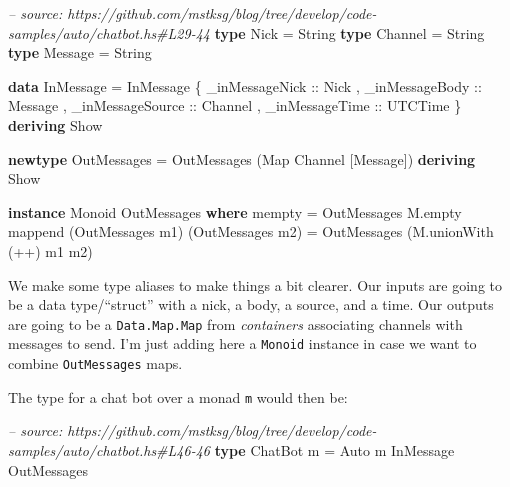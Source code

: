 \documentclass[]{article}
\newenvironment{Shaded}{}{}
\newcommand{\KeywordTok}[1]{\textcolor[rgb]{0.00,0.44,0.13}{\textbf{{#1}}}}
\newcommand{\DataTypeTok}[1]{\textcolor[rgb]{0.56,0.13,0.00}{{#1}}}
\newcommand{\CommentTok}[1]{\textcolor[rgb]{0.38,0.63,0.69}{\textit{{#1}}}}
\newcommand{\OtherTok}[1]{\textcolor[rgb]{0.00,0.44,0.13}{{#1}}}
\newcommand{\FunctionTok}[1]{\textcolor[rgb]{0.02,0.16,0.49}{{#1}}}
\newcommand{\NormalTok}[1]{{#1}}
\begin{document}
\begin{Shaded}
\begin{Highlighting}[]
\CommentTok{-- source: https://github.com/mstksg/blog/tree/develop/code-samples/auto/chatbot.hs#L29-44}
\KeywordTok{type} \DataTypeTok{Nick}    \FunctionTok{=} \DataTypeTok{String}
\KeywordTok{type} \DataTypeTok{Channel} \FunctionTok{=} \DataTypeTok{String}
\KeywordTok{type} \DataTypeTok{Message} \FunctionTok{=} \DataTypeTok{String}

\KeywordTok{data} \DataTypeTok{InMessage} \FunctionTok{=} \DataTypeTok{InMessage} \NormalTok{\{ _}\OtherTok{inMessageNick   ::} \DataTypeTok{Nick}
                           \NormalTok{, _}\OtherTok{inMessageBody   ::} \DataTypeTok{Message}
                           \NormalTok{, _}\OtherTok{inMessageSource ::} \DataTypeTok{Channel}
                           \NormalTok{, _}\OtherTok{inMessageTime   ::} \DataTypeTok{UTCTime}
                           \NormalTok{\} }\KeywordTok{deriving} \DataTypeTok{Show}

\KeywordTok{newtype} \DataTypeTok{OutMessages} \FunctionTok{=} \DataTypeTok{OutMessages} \NormalTok{(}\DataTypeTok{Map} \DataTypeTok{Channel} \NormalTok{[}\DataTypeTok{Message}\NormalTok{]) }\KeywordTok{deriving} \DataTypeTok{Show}

\KeywordTok{instance} \DataTypeTok{Monoid} \DataTypeTok{OutMessages} \KeywordTok{where}
    \NormalTok{mempty  }\FunctionTok{=} \DataTypeTok{OutMessages} \NormalTok{M.empty}
    \NormalTok{mappend (}\DataTypeTok{OutMessages} \NormalTok{m1) (}\DataTypeTok{OutMessages} \NormalTok{m2)}
            \FunctionTok{=} \DataTypeTok{OutMessages} \NormalTok{(M.unionWith (}\FunctionTok{++}\NormalTok{) m1 m2)}
\end{Highlighting}
\end{Shaded}

We make some type aliases to make things a bit clearer. Our inputs are going to be a data
type/``struct'' with a nick, a body, a source, and a time. Our outputs are going to be a
\texttt{Data.Map.Map} from \emph{containers} associating channels with messages to send. I'm just
adding here a \texttt{Monoid} instance in case we want to combine \texttt{OutMessages} maps.

The type for a chat bot over a monad \texttt{m} would then be:

\begin{Shaded}
\begin{Highlighting}[]
\CommentTok{-- source: https://github.com/mstksg/blog/tree/develop/code-samples/auto/chatbot.hs#L46-46}
\KeywordTok{type} \DataTypeTok{ChatBot} \NormalTok{m }\FunctionTok{=} \DataTypeTok{Auto} \NormalTok{m }\DataTypeTok{InMessage} \DataTypeTok{OutMessages}
\end{Highlighting}
\end{Shaded}
\end{document}
